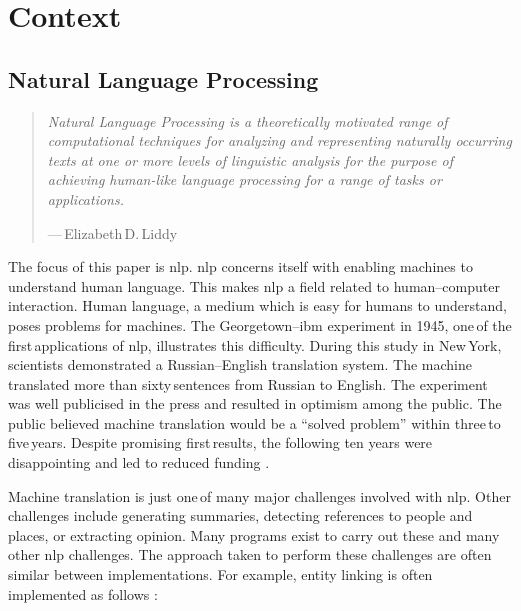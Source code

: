 \chapter{Context}\label{context}

\section{Natural Language Processing}\label{natural-language-processing}

\begin{quote}
  \textit{Natural Language Processing is a theoretically motivated range
    of computational techniques for analyzing and representing
    naturally occurring texts at one or more levels of linguistic
    analysis for the purpose of achieving human-like language processing
    for a range of tasks or applications.
  }

  \medskip
  ---\,Elizabeth\,D.\,Liddy \autocite*{natural-language-processing-liddy-2001}
\end{quote}

\noindent The focus of this paper is \gls{nlp}.
\gls{nlp} concerns itself with enabling machines to understand human
  language.
This makes \gls{nlp} a field related to human--computer interaction.
Human language, a medium which is easy for humans to understand, poses
  problems for machines.
The Georgetown--\gls{ibm} experiment in 1945, one\,of the first\,applications
  of \gls{nlp}, illustrates this difficulty.
During this study in New\,York, scientists demonstrated a
  Russian--English translation system.
The machine translated more than sixty\,sentences from Russian to English.
The experiment was well publicised in the press and resulted in optimism
  among the public.
The public believed machine translation would be a ``solved problem'' within
  three\,to\,five\,years.
Despite promising first\,results, the following ten years were disappointing
  and led to reduced funding \autocite{hutchins-john-georgetown-ibm-system}.

Machine translation is just one\,of many major challenges involved with
  \gls{nlp}.
Other challenges include generating summaries, detecting references to people
  and places, or extracting opinion.
Many programs exist to carry out these and many other \gls{nlp} challenges.
The approach taken to perform these challenges are often similar between
  implementations.
For example, entity linking is often implemented as follows
  \autocite[according to][]{stanbol-enhancer-nlp}:


